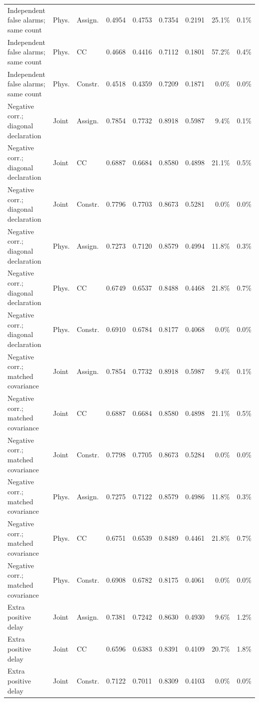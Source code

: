 \begin{longtable}{@{}p{3.8cm}llrrrrrr@{}}
Independent false alarms; same count & Phys. & Assign. & 0.4954 & 0.4753 & 0.7354 & 0.2191 & 25.1\% & 0.1\% \\
Independent false alarms; same count & Phys. & CC & 0.4668 & 0.4416 & 0.7112 & 0.1801 & 57.2\% & 0.4\% \\
Independent false alarms; same count & Phys. & Constr. & 0.4518 & 0.4359 & 0.7209 & 0.1871 & 0.0\% & 0.0\% \\
Negative corr.; diagonal declaration & Joint & Assign. & 0.7854 & 0.7732 & 0.8918 & 0.5987 & 9.4\% & 0.1\% \\
Negative corr.; diagonal declaration & Joint & CC & 0.6887 & 0.6684 & 0.8580 & 0.4898 & 21.1\% & 0.5\% \\
Negative corr.; diagonal declaration & Joint & Constr. & 0.7796 & 0.7703 & 0.8673 & 0.5281 & 0.0\% & 0.0\% \\
Negative corr.; diagonal declaration & Phys. & Assign. & 0.7273 & 0.7120 & 0.8579 & 0.4994 & 11.8\% & 0.3\% \\
Negative corr.; diagonal declaration & Phys. & CC & 0.6749 & 0.6537 & 0.8488 & 0.4468 & 21.8\% & 0.7\% \\
Negative corr.; diagonal declaration & Phys. & Constr. & 0.6910 & 0.6784 & 0.8177 & 0.4068 & 0.0\% & 0.0\% \\
Negative corr.; matched covariance & Joint & Assign. & 0.7854 & 0.7732 & 0.8918 & 0.5987 & 9.4\% & 0.1\% \\
Negative corr.; matched covariance & Joint & CC & 0.6887 & 0.6684 & 0.8580 & 0.4898 & 21.1\% & 0.5\% \\
Negative corr.; matched covariance & Joint & Constr. & 0.7798 & 0.7705 & 0.8673 & 0.5284 & 0.0\% & 0.0\% \\
Negative corr.; matched covariance & Phys. & Assign. & 0.7275 & 0.7122 & 0.8579 & 0.4986 & 11.8\% & 0.3\% \\
Negative corr.; matched covariance & Phys. & CC & 0.6751 & 0.6539 & 0.8489 & 0.4461 & 21.8\% & 0.7\% \\
Negative corr.; matched covariance & Phys. & Constr. & 0.6908 & 0.6782 & 0.8175 & 0.4061 & 0.0\% & 0.0\% \\
Extra positive delay & Joint & Assign. & 0.7381 & 0.7242 & 0.8630 & 0.4930 & 9.6\% & 1.2\% \\
Extra positive delay & Joint & CC & 0.6596 & 0.6383 & 0.8391 & 0.4109 & 20.7\% & 1.8\% \\
Extra positive delay & Joint & Constr. & 0.7122 & 0.7011 & 0.8309 & 0.4103 & 0.0\% & 0.0\% \\

\end{longtable}
